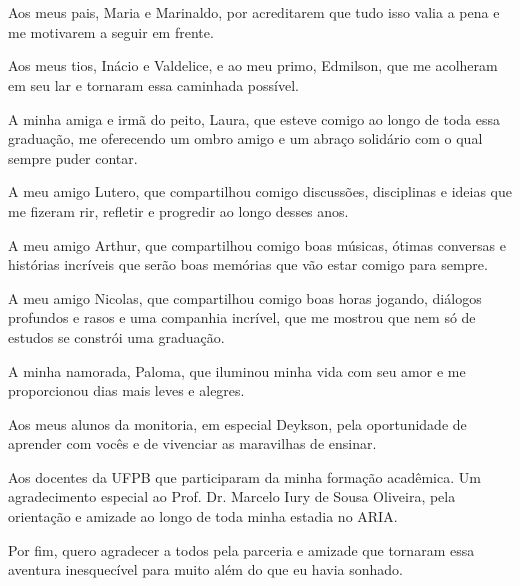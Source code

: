\section*{}

Aos meus pais, Maria e Marinaldo, por acreditarem que tudo isso valia a pena e
me motivarem a seguir em frente.

Aos meus tios, Inácio e Valdelice, e ao meu primo, Edmilson, que me acolheram
em seu lar e tornaram essa caminhada possível.

A minha amiga e irmã do peito, Laura, que esteve comigo ao longo de toda essa
graduação, me oferecendo um ombro amigo e um abraço solidário com o qual sempre
puder contar.

A meu amigo Lutero, que compartilhou comigo discussões, disciplinas e ideias
que me fizeram rir, refletir e progredir ao longo desses anos.

A meu amigo Arthur, que compartilhou comigo boas músicas, ótimas conversas e
histórias incríveis que serão boas memórias que vão estar comigo para sempre.

A meu amigo Nicolas, que compartilhou comigo boas horas jogando, diálogos
profundos e rasos e uma companhia incrível, que me mostrou que nem só de
estudos se constrói uma graduação.

A minha namorada, Paloma, que iluminou minha vida com seu amor e me
proporcionou dias mais leves e alegres.

Aos meus alunos da monitoria, em especial Deykson, pela oportunidade de
aprender com vocês e de vivenciar as maravilhas de ensinar.

Aos docentes da UFPB que participaram da minha formação acadêmica.
Um agradecimento especial ao Prof. Dr. Marcelo Iury de Sousa Oliveira,
pela orientação e amizade ao longo de toda minha estadia no ARIA.

Por fim, quero agradecer a todos pela parceria e amizade que tornaram essa
aventura inesquecível para muito além do que eu havia sonhado.

\noindent